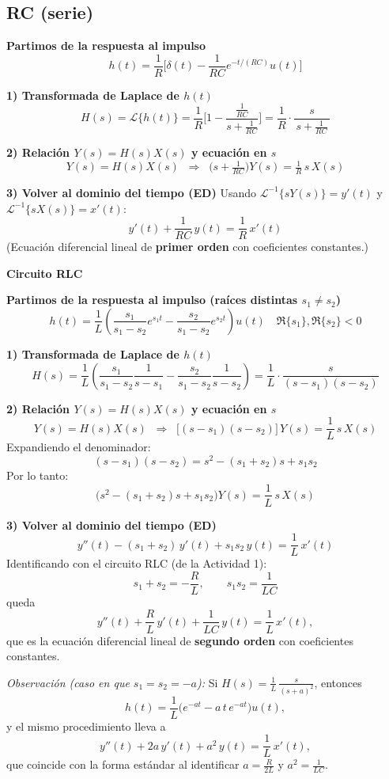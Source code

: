 \subsection*{RC (serie)}

\textbf{Partimos de la respuesta al impulso}
\[
h(t)=\frac{1}{R}\Big[\delta(t)-\frac{1}{RC}e^{-t/(RC)}u(t)\Big]
\]

\textbf{1) Transformada de Laplace de $h(t)$}
\[
H(s)=\mathscr{L}\{h(t)\}
=\frac{1}{R}\Big[1-\frac{\tfrac{1}{RC}}{s+\tfrac{1}{RC}}\Big]
=\frac{1}{R}\cdot\frac{s}{\,s+\tfrac{1}{RC}\,}
\]

\textbf{2) Relación $Y(s)=H(s)X(s)$ y ecuación en $s$}
\[
Y(s)=H(s)X(s)\;\;\Longrightarrow\;\;
\Big(s+\tfrac{1}{RC}\Big)Y(s)=\tfrac{1}{R}\,s\,X(s)
\]

\textbf{3) Volver al dominio del tiempo (ED)}
Usando \(\mathscr{L}^{-1}\{sY(s)\}=y'(t)\) y \(\mathscr{L}^{-1}\{sX(s)\}=x'(t)\):
\[
y'(t)+\frac{1}{RC}\,y(t)=\frac{1}{R}\,x'(t)
\]
(Ecuación diferencial lineal de \textbf{primer orden} con coeficientes constantes.)

\bigskip

\textbf{Circuito RLC}

\textbf{Partimos de la respuesta al impulso (raíces distintas $s_1\neq s_2$)}
\[
h(t)=\frac{1}{L}\left(\frac{s_1}{s_1-s_2}e^{s_1 t}
-\frac{s_2}{s_1-s_2}e^{s_2 t}\right)u(t)
\quad \Re\{s_1\},\Re\{s_2\}<0
\]

\textbf{1) Transformada de Laplace de $h(t)$}
\[
H(s)=\frac{1}{L}\left(\frac{s_1}{s_1-s_2}\frac{1}{s-s_1}
-\frac{s_2}{s_1-s_2}\frac{1}{s-s_2}\right)
=\frac{1}{L}\cdot\frac{s}{(s-s_1)(s-s_2)}
\]

\textbf{2) Relación $Y(s)=H(s)X(s)$ y ecuación en $s$}
\[
Y(s)=H(s)X(s)\;\;\Longrightarrow\;\;
\big[(s-s_1)(s-s_2)\big]\,Y(s)=\frac{1}{L}\,s\,X(s)
\]
Expandiendo el denominador:
\[
(s-s_1)(s-s_2)=s^2-(s_1+s_2)s+s_1 s_2
\]
Por lo tanto:
\[
\Big(s^2-(s_1+s_2)s+s_1 s_2\Big)Y(s)=\frac{1}{L}\,s\,X(s)
\]

\textbf{3) Volver al dominio del tiempo (ED)}
\[
y''(t)-(s_1+s_2)\,y'(t)+s_1 s_2\,y(t)=\frac{1}{L}\,x'(t)
\]
Identificando con el circuito RLC (de la Actividad 1): 
\[
s_1+s_2=-\frac{R}{L},\qquad s_1 s_2=\frac{1}{LC}
\]
queda
\[
y''(t)+\frac{R}{L}\,y'(t)+\frac{1}{LC}\,y(t)=\frac{1}{L}\,x'(t),
\]
que es la ecuación diferencial lineal de \textbf{segundo orden} con coeficientes constantes.

\medskip
\textit{Observación (caso en que $s_1=s_2=-a$):} 
Si $H(s)=\tfrac{1}{L}\,\tfrac{s}{(s+a)^2}$, entonces 
\[
h(t)=\frac{1}{L}\big(e^{-a t}-a\,t\,e^{-a t}\big)u(t),
\]
y el mismo procedimiento lleva a
\[
y''(t)+2a\,y'(t)+a^2\,y(t)=\frac{1}{L}\,x'(t),
\]
que coincide con la forma estándar al identificar \(a=\tfrac{R}{2L}\) y \(a^2=\tfrac{1}{LC}\).
